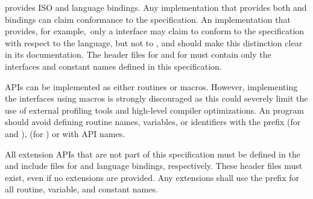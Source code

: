 \openshmem provides ISO \Cstd and \Fortran[90] language bindings.
Any implementation that provides both \Cstd and \Fortran bindings can claim
conformance to the specification. An implementation that provides, for example,\ only a
\Cstd interface may claim to conform to the \openshmem specification with
respect to the \Cstd language, but not to \Fortran, and should make this distinction
clear in its documentation. The \openshmem header files  for
\Cstd and  for
\Fortran must contain only the interfaces and constant names defined in this
specification.

\openshmem \acp{API} can be implemented as either routines or macros. However,
implementing the interfaces using macros is strongly discouraged as this could
severely limit the use of external profiling tools and high-level compiler
optimizations. An \openshmem program should avoid defining routine names,
variables, or identifiers with the prefix \shmemprefix (for \Cstd and
\Fortran), \shmemprefixC (for \Cstd) or with \openshmem \ac{API} names.

All \openshmem extension \acp{API} that are not part of this specification must
be defined in the  and  include files for
\Cstd and \Fortran language bindings, respectively.  These header files
must exist, even if no extensions are provided.  Any extensions shall use the
 prefix for all routine, variable, and constant names.
